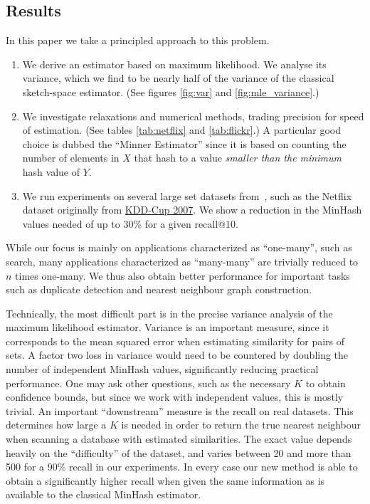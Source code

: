 \subsection{Results}

In this paper we take a principled approach to this problem.
\begin{enumerate}
   \item We derive an estimator based on maximum likelihood.
      We analyse its variance, which we find to be nearly half of the variance of the classical sketch-space estimator. (See figures \ref{fig:var} and \ref{fig:mle_variance}.)
   \item We investigate relaxations and numerical methods, trading precision for speed of estimation. (See tables \ref{tab:netflix} and \ref{tab:flickr}.)
      A particular good choice is dubbed the ``Minner Estimator'' since it is based on counting the number of elements in $X$ that hash to a value \emph{smaller than the minimum} hash value of $Y$.
   \item We run experiments on several large set datasets from~\cite{mann2016empirical},
      such as the Netflix dataset originally from \href{https://www.cs.uic.edu/~liub/Netflix-KDD-Cup-2007.html}{KDD-Cup 2007}.
      We show a reduction in the MinHash values needed of up to 30\% for a given recall@10.
\end{enumerate}

While our focus is mainly on applications characterized as ``one-many'', such as search, many applications characterized as ``many-many'' are trivially reduced to $n$ times one-many.
We thus also obtain better performance for important tasks such as duplicate detection and nearest neighbour graph construction.


Technically, the most difficult part is in the precise variance analysis of the maximum likelihood estimator.
Variance is an important measure, since it corresponds to the mean squared error when estimating similarity for pairs of sets.
A factor two loss in variance would need to be countered by doubling the number of independent MinHash values, significantly reducing practical performance.
One may ask other questions, such as the necessary $K$ to obtain confidence bounds,
but since we work with independent values, this is mostly trivial.
An important ``downstream'' measure is the recall on real datasets.
This determines how large a $K$ is needed in order to return the true nearest neighbour when scanning a database with estimated similarities.
The exact value depends heavily on the ``difficulty'' of the dataset, and varies between 20 and more than 500 for a 90\% recall in our experiments.
In every case our new method is able to obtain a significantly higher recall when given the same information as is available to the classical MinHash estimator.

